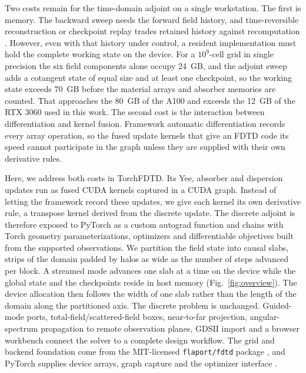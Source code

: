 \documentclass[preprint,11pt]{elsarticle}
\newcommand{\code}[1]{{\small\nolinkurl{#1}}}
\begin{document}
Two costs remain for the time-domain adjoint on a single workstation. The first is memory. The backward sweep needs the forward field history, and time-reversible reconstruction or checkpoint replay trades retained history against recomputation \citep{griewank2000,mahlau2024,mahlau2026}. However, even with that history under control, a resident implementation must hold the complete working state on the device. For a $10^9$-cell grid in single precision the six field components alone occupy 24~GB, and the adjoint sweep adds a cotangent state of equal size and at least one checkpoint, so the working state exceeds 70~GB before the material arrays and absorber memories are counted. That approaches the 80~GB of the A100 and exceeds the 12~GB of the RTX 3060 used in this work. The second cost is the interaction between differentiation and kernel fusion. Framework automatic differentiation records every array operation, so the fused update kernels that give an FDTD code its speed cannot participate in the graph unless they are supplied with their own derivative rules.

Here, we address both costs in TorchFDTD. Its Yee, absorber and dispersion updates run as fused CUDA kernels captured in a CUDA graph. Instead of letting the framework record these updates, we give each kernel its own derivative rule, a transpose kernel derived from the discrete update. The discrete adjoint is therefore exposed to PyTorch as a custom autograd function and chains with Torch geometry parameterizations, optimizers and differentiable objectives built from the supported observations. We partition the field state into causal slabs, strips of the domain padded by halos as wide as the number of steps advanced per block. A streamed mode advances one slab at a time on the device while the global state and the checkpoints reside in host memory (Fig.~\ref{fig:overview}). The device allocation then follows the width of one slab rather than the length of the domain along the partitioned axis. The discrete problem is unchanged. Guided-mode ports, total-field/scattered-field boxes, near-to-far projection, angular-spectrum propagation to remote observation planes, GDSII import and a browser workbench connect the solver to a complete design workflow. The grid and backend foundation come from the MIT-licensed \code{flaport/fdtd} package \citep{fdtd}, and PyTorch supplies device arrays, graph capture and the optimizer interface \citep{paszke2019}.
\end{document}
